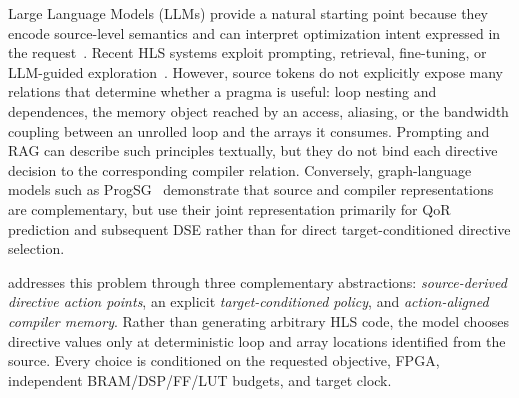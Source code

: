 Large Language Models (LLMs) provide a natural starting point because they
encode source-level semantics and can interpret optimization intent expressed
in the request~\cite{pan2025survey}. Recent HLS systems exploit prompting, retrieval, fine-tuning, or LLM-guided exploration~\cite{xiong2024hlspilot,
prakriya2025lift,wang2025llmdse,xu2026mpmllm4dse}. However, source tokens do
not explicitly expose many relations that determine whether a pragma is useful:
loop nesting and dependences, the memory object reached by an access, aliasing,
or the bandwidth coupling between an unrolled loop and the arrays it consumes.
Prompting and RAG can describe such principles textually, but they do not bind
each directive decision to the corresponding compiler relation. Conversely, graph-language models such as ProgSG~\cite{bai2023progsg} demonstrate that source and compiler representations are complementary, but use their joint
representation primarily for QoR prediction and subsequent DSE rather than
for direct target-conditioned directive selection.

\framework addresses this problem through three complementary abstractions:
\emph{source-derived directive action points}, an explicit \emph{target-conditioned policy}, and \emph{action-aligned compiler memory}.
Rather than generating arbitrary HLS code, the model chooses directive values
only at deterministic loop and array locations identified from the source.
Every choice is conditioned on the requested objective, FPGA, independent
BRAM/DSP/FF/LUT budgets, and target clock.



